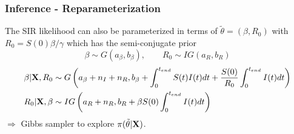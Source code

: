 \documentclass{beamer}
\begin{document}
\begin{frame} \frametitle{Inference - Reparameterization}  
	
The SIR likelihood can also be parameterized in terms of $\tilde{\theta} = (\beta, R_0)$ with $R_0 = S(0) \beta / \gamma$
which has the semi-conjugate prior
\begin{equation*}
	\beta \sim G(a_{\beta}, b_{\beta}), \qquad R_0 \sim IG(a_{R}, b_{R})
\end{equation*}
\begin{align*}
\beta | \mathbf{X}, R_0 & \sim G\left( a_{\beta} + n_I + n_R, b_{\beta} + \int_{0}^{t_{end}} S(t)I(t) dt + \frac{S(0)}{R_0} \int_{0}^{t_{end}} I(t) dt\right) \\
R_0 | \mathbf{X}, \beta & \sim IG\left( a_{R} + n_R, b_{R} + \beta S(0) \int_{0}^{t_{end}} I(t) dt\right)
\end{align*}
$\Rightarrow$ Gibbs sampler to explore $\pi(\tilde{\theta}|\mathbf{X})$.
\end{frame}
\end{document}
